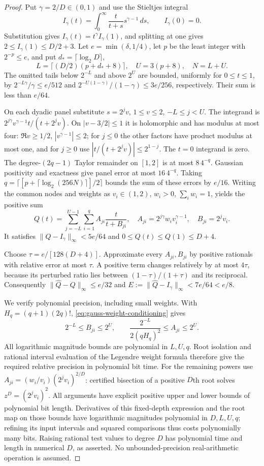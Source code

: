 \begin{proof}
Put $\gamma=2/D\in(0,1)$ and use the Stieltjes integral
\[
 I_\gamma(t)=\int_0^\infty\frac{t}{t+s}s^{\gamma-1}\,ds,
 \qquad I_\gamma(0)=0.
\]
Substitution gives $I_\gamma(t)=t^\gamma I_\gamma(1)$, and splitting
at one gives $2\le I_\gamma(1)\le D/2+3$.
Let $e=\min(\delta,1/4)$, let $p$ be the least integer with
$2^{-p}\le e$, and put $d_*=\lceil\log_2D\rceil$,
\[
 L=\lceil(D/2)(p+d_*+8)\rceil,\quad U=3(p+8),\quad N=L+U.
\]
The omitted tails below $2^{-L}$ and above $2^U$ are bounded,
uniformly for $0\le t\le1$, by
$2^{-L\gamma}/\gamma\le e/512$ and
$2^{-U(1-\gamma)}/(1-\gamma)\le3e/256$, respectively.
Their sum is less than $e/64$.

On each dyadic panel substitute $s=2^jv$, $1\le v\le2$,
$-L\le j<U$. The integrand is
$2^{j\gamma}v^{\gamma-1}t/(t+2^jv)$.
On $|v-3/2|\le1$ it is holomorphic and has modulus at most four:
$\Re v\ge1/2$, $|v^{\gamma-1}|\le2$; for $j\le0$ the other
factors have product modulus at most one, and for $j\ge0$ use
$|t/(t+2^jv)|\le2^{1-j}$. The $t=0$ integrand is zero.
The degree-$(2q-1)$ Taylor remainder on $[1,2]$ is at most
$8\,4^{-q}$. Gaussian positivity and exactness give panel error
at most $16\,4^{-q}$. Taking
$q=\lceil[p+\lceil\log_2(256N)\rceil]/2\rceil$
bounds the sum of these errors by $e/16$.
Writing the common nodes and weights as $v_i\in(1,2)$, $w_i>0$,
$\sum_iw_i=1$, yields the positive sum
\[
 Q(t)=\sum_{j=-L}^{U-1}\sum_{i=1}^q A_{ji}\frac{t}{t+B_{ji}},
 \quad A_{ji}=2^{j\gamma}w_iv_i^{\gamma-1},\quad B_{ji}=2^jv_i.
\]
It satisfies $\|Q-I_\gamma\|_\infty<5e/64$ and
$0\le Q(t)\le Q(1)\le D+4$.

Choose $\tau=e/[128(D+4)]$. Approximate every $A_{ji},B_{ji}$
by positive rationals with relative error at most $\tau$. A positive
term changes relatively by at most $4\tau$, because its perturbed
ratio lies between $(1-\tau)/(1+\tau)$ and its reciprocal.
Consequently $\|\widehat Q-Q\|_\infty\le e/32$ and
$E:=\|\widehat Q-I_\gamma\|_\infty<7e/64<e/8$.

We verify polynomial precision, including small weights. With
$H_q=(q+1)(2q)!$, \eqref{eq:gauss-weight-conditioning} gives
\[
 2^{-L}\le B_{ji}\le2^U,\qquad
 \frac{2^{-L}}{2(qH_q)^2}\le A_{ji}\le2^U.
\]
All logarithmic magnitude bounds are polynomial in $L,U,q$.
Root isolation and rational interval evaluation of the Legendre weight
formula therefore give the required relative precision in polynomial
bit time. For the remaining powers use
$A_{ji}=(w_i/v_i)(2^jv_i)^{2/D}$: certified bisection of a positive
$D$th root solves $z^D=(2^jv_i)^2$. All arguments have explicit
positive upper and lower bounds of polynomial bit length. Derivatives
of this fixed-depth expression and the root map on those bounds have
logarithmic magnitudes polynomial in $D,L,U,q$; refining its input
intervals and squared comparisons thus costs polynomially many bits.
Raising rational test values to degree $D$ has polynomial time and
length in numerical $D$, as asserted. No unbounded-precision
real-arithmetic operation is assumed.


\end{proof}
